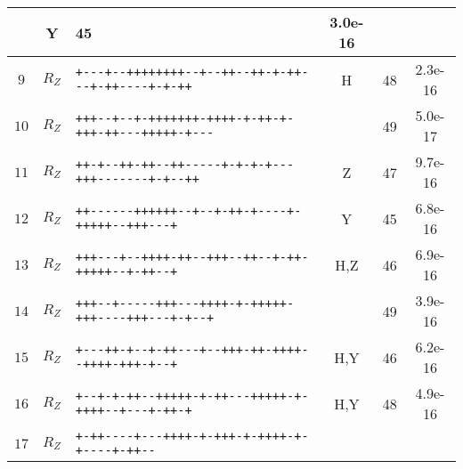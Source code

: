 {\begin{tabular}{|c|c|l|c|c|c|}
        & Y 
        & 45 
        & 3.0e-16
    \\\hline 
        $9$ 
        & $R_Z$ 
        & \texttt{+{}-{}-{}-{}+{}-{}-{}+{}+{}+{}+{}+{}+{}+{}+{}-{}-{}+{}-{}-{}+{}+{}-{}-{}+{}+{}-{}+{}-{}+{}+{}-{}-{}-{}+{}-{}+{}+{}-{}-{}-{}-{}+{}-{}+{}-{}+{}+} 
        & H 
        & 48 
        & 2.3e-16
    \\\hline 
        $10$ 
        & $R_Z$ 
        & \texttt{+{}+{}+{}-{}-{}+{}-{}-{}+{}-{}+{}+{}+{}+{}+{}+{}+{}-{}+{}+{}+{}+{}-{}+{}-{}+{}+{}-{}+{}-{}+{}+{}+{}-{}+{}+{}-{}-{}-{}+{}+{}+{}+{}+{}-{}+{}-{}-{}-} 
        &  
        & 49 
        & 5.0e-17
    \\\hline 
        $11$ 
        & $R_Z$ 
        & \texttt{+{}+{}-{}+{}-{}-{}+{}+{}-{}+{}+{}-{}-{}+{}+{}-{}-{}-{}-{}-{}+{}-{}+{}-{}+{}-{}+{}-{}-{}-{}+{}+{}+{}-{}-{}-{}-{}-{}-{}-{}+{}-{}+{}-{}-{}+{}+} 
        & Z 
        & 47 
        & 9.7e-16
    \\\hline 
        $12$ 
        & $R_Z$ 
        & \texttt{+{}+{}-{}-{}-{}-{}-{}-{}+{}+{}+{}+{}+{}+{}-{}-{}+{}-{}-{}+{}-{}+{}+{}-{}+{}-{}-{}-{}-{}+{}-{}+{}+{}+{}+{}+{}-{}-{}+{}+{}+{}-{}-{}-{}+} 
        & Y 
        & 45 
        & 6.8e-16
    \\\hline 
        $13$ 
        & $R_Z$ 
        & \texttt{+{}+{}+{}-{}-{}-{}+{}-{}-{}+{}+{}+{}+{}-{}+{}+{}-{}-{}+{}+{}+{}-{}-{}+{}+{}-{}-{}+{}-{}+{}+{}-{}+{}+{}+{}+{}+{}-{}-{}+{}-{}+{}+{}-{}-{}+} 
        & H,Z 
        & 46 
        & 6.9e-16
    \\\hline 
        $14$ 
        & $R_Z$ 
        & \texttt{+{}+{}+{}-{}-{}+{}-{}-{}-{}-{}-{}+{}+{}+{}-{}-{}-{}+{}+{}+{}+{}-{}+{}-{}+{}+{}+{}+{}+{}-{}+{}+{}+{}-{}-{}-{}-{}+{}+{}+{}-{}-{}-{}+{}-{}+{}-{}-{}+} 
        &  
        & 49 
        & 3.9e-16
    \\\hline 
        $15$ 
        & $R_Z$ 
        & \texttt{+{}-{}-{}-{}+{}+{}-{}+{}-{}-{}+{}-{}+{}+{}-{}-{}-{}+{}-{}-{}+{}+{}+{}-{}+{}+{}-{}+{}+{}+{}+{}-{}-{}+{}+{}+{}+{}-{}+{}+{}+{}-{}+{}-{}-{}+} 
        & H,Y 
        & 46 
        & 6.2e-16
    \\\hline 
        $16$ 
        & $R_Z$ 
        & \texttt{+{}-{}-{}+{}-{}+{}-{}+{}+{}-{}-{}+{}+{}+{}+{}+{}-{}+{}-{}+{}+{}-{}-{}-{}+{}+{}+{}+{}+{}-{}+{}-{}+{}+{}+{}+{}-{}-{}+{}-{}-{}-{}+{}-{}+{}+{}-{}+} 
        & H,Y 
        & 48 
        & 4.9e-16
    \\\hline 
        $17$ 
        & $R_Z$ 
        & \texttt{+{}-{}+{}+{}-{}-{}-{}-{}+{}-{}-{}-{}+{}+{}+{}+{}-{}+{}-{}+{}+{}+{}-{}+{}-{}+{}+{}+{}+{}-{}+{}-{}+{}-{}-{}-{}-{}+{}-{}+{}+{}-{}-} 

\end{tabular}}
